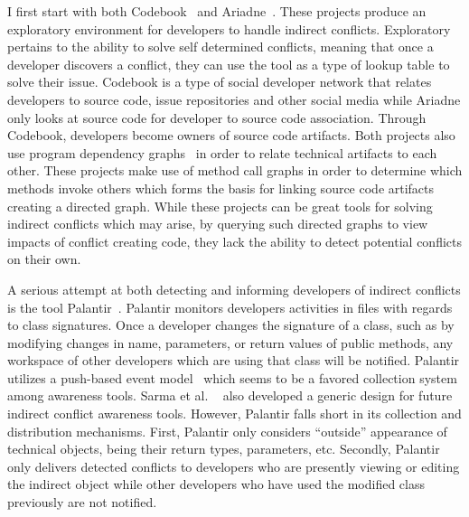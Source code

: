 I first start with both Codebook~\cite{Begel:2010:CDE} and 
Ariadne~\cite{Trainer:2005:BGT}. These projects produce an exploratory
environment for developers to handle indirect conflicts. Exploratory
pertains to the ability to solve self determined conflicts, meaning that
once a developer discovers a conflict, they can use the tool as a type of
lookup table to solve their issue. Codebook is a type of social developer
network that relates developers to source code, issue repositories and
other social media while Ariadne only looks at source code for developer
to source code association. Through Codebook, developers become
owners of source code artifacts. Both projects also use program 
dependency graphs~\cite{Horwitz:1992:UPD}
in order to relate technical artifacts to each other. These projects make 
use of method call graphs in order to 
determine which methods invoke others which forms the basis for 
linking source code artifacts creating a directed graph. While these 
projects can be great tools 
for solving indirect conflicts which may arise, by querying such directed
graphs to view impacts of conflict creating code, they lack the ability to
detect potential conflicts on their own.

A serious attempt at both detecting and informing developers of
indirect conflicts is the tool Palantir~\cite{Sarma:2007:TSA}. Palantir
monitors developers activities in files with regards to class signatures.
Once a developer changes the signature of a class, such as by modifying changes
in name, parameters, or return values of public methods, any workspace
of other developers which are using that class will be notified. Palantir utilizes
a push-based event model~\cite{Fitzpatrick:2002:SPA} which seems to be
a favored collection system among awareness tools. Sarma et al.
~\cite{Sarma:2007:TSA} also
developed a generic design for future indirect conflict awareness tools. 
However, Palantir falls short in its collection and distribution
mechanisms. First, Palantir only considers ``outside'' appearance of technical
objects, being their return types, parameters, etc. Secondly, Palantir 
only delivers
detected conflicts to developers who are presently viewing or editing
the indirect object while other developers who have used the modified 
class previously are not notified.

